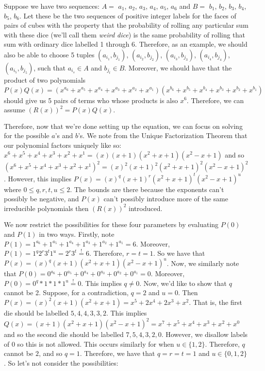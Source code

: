 \documentclass[12pt]{report}
\begin{document}
Suppose we have two sequences: $A=$ $a_{1}$, $a_{2}$, $a_{3}$, $a_{4}$, $a_{5}$, $a_{6}$ and $B=$ $b_{1}$, $b_{2}$, $b_{3}$, $b_{4}$, $b_{5}$, $b_{6}$. Let these be the two sequences of positive integer labels for the faces of pairs of cubes with the property that the probability of rolling any particular sum with these dice (we'll call them \textit{weird dice}) is the same probability of rolling that sum with ordinary dice labelled 1 through 6. Therefore, as an example, we should also be able to choose 5 tuples $(a_{i_{1}}, b_{j_{1}})$, $(a_{i_{2}}, b_{j_{2}})$, $(a_{i_{3}}, b_{j_{3}})$, $(a_{i_{4}}, b_{j_{4}})$, $(a_{i_{5}}, b_{j_{5}})$, such that $a_{i_{s}} \in A$ and $b_{j_{t}} \in B$. Moreover, we should have that the product of two polynomials $P(x)Q(x)=(x^{a_{6}}+x^{a_{5}}+x^{a_{4}}+x^{a_{3}}+x^{a_{2}}+x^{a_{1}})
(x^{b_{6}}+x^{b_{5}}+x^{b_{4}}+x^{b_{3}}+x^{b_{2}}+x^{b_{1}})$ should give us 5 pairs of terms who whose products is also $x^{6}$. Therefore, we can assume $(R(x))^{2}=P(x)Q(x)$.

Therefore, now that we're done setting up the equation, we can focus on solving for the possible $a$'s and $b$'s. We note from the Unique Factorization Theorem that our polynomial factors uniquely like so: $x^{6}+x^{5}+x^{4}+x^{3}+x^{2}+x^{1} = (x)(x+1)(x^{2}+x+1)(x^{2}-x+1)$ and so $(x^{6}+x^{5}+x^{4}+x^{3}+x^{2}+x^{1})^2 = (x)^{2}(x+1)^{2}(x^{2}+x+1)^{2}(x^{2}-x+1)^{2}$. However, this implies $P(x)=(x)^{q}(x+1)^{r}(x^{2}+x+1)^{t}(x^{2}-x+1)^{u}$ where $0\leq q,r,t,u \leq 2$. The bounds are there because the exponents can't possibly be negative, and $P(x)$ can't possibly introduce more of the same irreducible polynomials then $(R(x))^2$ introduced.

We now restrict the possibilities for these four parameters by evaluating $P(0)$ and $P(1)$ in two ways. Firstly, note $P(1)=1^{a_{6}}+1^{a_{5}}+1^{a_{4}}+1^{a_{3}}+1^{a_{2}}+1^{a_{1}}=6$. Moreover, $P(1)=1^{q}2^{r}3^{t}1^{u}=2^{r}3^{t} \stackrel{!}{=} 6$. Therefore, $r=t=1$. So we have that $P(x)=(x)^{q}(x+1)(x^{2}+x+1)(x^{2}-x+1)^{u}$. Now, we similarly note that $P(0)=0^{a_{6}}+0^{a_{5}}+0^{a_{4}}+0^{a_{3}}+0^{a_{2}}+0^{a_{1}}=0$. Moreover, $P(0)=0^{q}*1*1*1^{u} \stackrel{!}{=} 0$. This implies $q \neq 0$. Now, we'd like to show that $q$ cannot be 2. Suppose, for a contradiction, $q=2$ and $u=0$. Then $P(x)=(x)^{2}(x+1)(x^{2}+x+1)=x^{5}+2x^{4}+2x^{3}+x^{2}$. That is, the first die should be labelled $5,4,4,3,3,2$. This implies $Q(x)=(x+1)(x^{2}+x+1)(x^{2}-x+1)^{2}=x^{7}+x^{5}+x^{4}+x^{3}+x^{2}+x^{0}$ and so the second die should be labelled $7,5,4,3,2,0$. However, we disallow labels of $0$ so this is not allowed. This occurs similarly for when $u\in \{1,2\}$. Therefore, $q$ cannot be $2$, and so $q=1$. Therefore, we have that $q=r=t=1$ and $u\in \{0,1,2\}$. So let's not consider the possibilities:
\end{document}
